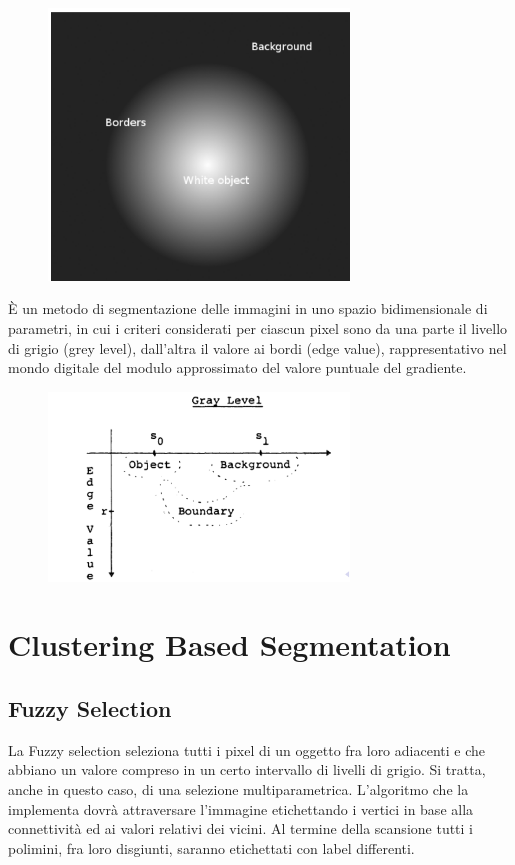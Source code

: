 \begin{figure}[H]
    \centering
    \includegraphics[width=8cm, keepaspectratio]{capitoli/immagini/imgs/rosenfeld.png}
\end{figure}

È un metodo di segmentazione delle immagini in uno spazio bidimensionale di parametri, in cui i criteri considerati per ciascun
pixel sono da una parte il livello di grigio (grey level), dall'altra il valore ai bordi (edge value), rappresentativo nel mondo digitale del
modulo approssimato del valore puntuale del gradiente.

\begin{figure}[H]
    \centering
    \includegraphics[width=8cm, keepaspectratio]{capitoli/immagini/imgs/edgepanda.png}
\end{figure}

\section{Clustering Based Segmentation}
\subsection{Fuzzy Selection}

La Fuzzy selection seleziona tutti i pixel di un oggetto fra loro adiacenti e che abbiano un valore compreso in un certo intervallo di livelli di grigio.
Si tratta, anche in questo caso, di una selezione multiparametrica. L'algoritmo che la implementa dovrà attraversare l'immagine etichettando i vertici in base alla connettività ed ai valori relativi dei vicini.
Al termine della scansione tutti i polimini, fra loro disgiunti, saranno etichettati con label differenti.

